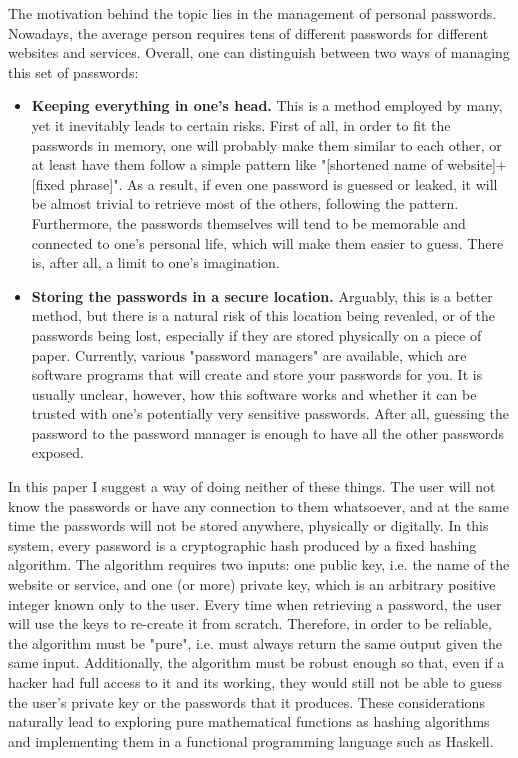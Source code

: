 \documentclass[12pt, a4paper]{article}
\begin{document}
The motivation behind the topic lies in the management of personal passwords. Nowadays, the average person requires tens of different passwords for different websites and services. Overall, one can distinguish between two ways of managing this set of passwords:

\begin{itemize}
    \item \textbf{Keeping everything in one's head.} This is a method employed by many, yet it inevitably leads to certain risks. First of all, in order to fit the passwords in memory, one will probably make them similar to each other, or at least have them follow a simple pattern like "[shortened name of website]+[fixed phrase]". As a result, if even one password is guessed or leaked, it will be almost trivial to retrieve most of the others, following the pattern. Furthermore, the passwords themselves will tend to be memorable and connected to one's personal life, which will make them easier to guess. There is, after all, a limit to one's imagination.
    \item \textbf{Storing the passwords in a secure location.} Arguably, this is a better method, but there is a natural risk of this location being revealed, or of the passwords being lost, especially if they are stored physically on a piece of paper. Currently, various "password managers" are available, which are software programs that will create and store your passwords for you. It is usually unclear, however, how this software works and whether it can be trusted with one's potentially very sensitive passwords. After all, guessing the password to the password manager is enough to have all the other passwords exposed.
\end{itemize}

In this paper I suggest a way of doing neither of these things. The user will not know the passwords or have any connection to them whatsoever, and at the same time the passwords will not be stored anywhere, physically or digitally. In this system, every password is a cryptographic hash produced by a fixed hashing algorithm. The algorithm requires two inputs: one public key, i.e. the name of the website or service, and one (or more) private key, which is an arbitrary positive integer known only to the user. Every time when retrieving a password, the user will use the keys to re-create it from scratch. Therefore, in order to be reliable, the algorithm must be "pure", i.e. must always return the same output given the same input. Additionally, the algorithm must be robust enough so that, even if a hacker had full access to it and its working, they would still not be able to guess the user's private key or the passwords that it produces. These considerations naturally lead to exploring pure mathematical functions as hashing algorithms and implementing them in a functional programming language such as Haskell.
\end{document}

